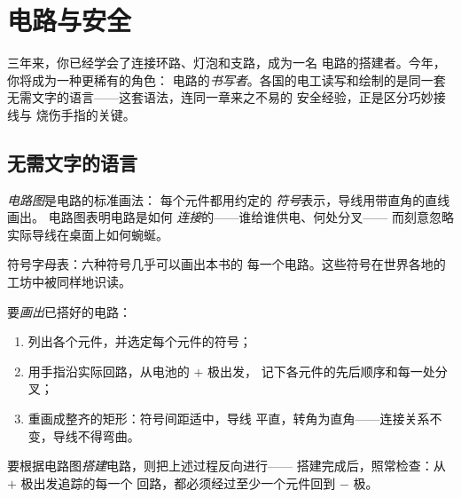 \chapter{电路与安全}\label{ch:g6:circuits-and-safety}

三年来，你已经学会了连接环路、灯泡和支路，成为一名
电路的搭建者。今年，你将成为一种更稀有的角色：
电路的\emph{书写者}。各国的电工读写和绘制的是同一套
无需文字的语言——这套语法，连同一章来之不易的
安全经验，正是区分巧妙接线与
烧伤手指的关键。

\section{无需文字的语言}

\begin{definition}[电路图]\label{def:g6:circuits-and-safety:diagram}
\emph{电路图}是电路的标准画法：
每个元件都用约定的
\emph{符号}表示，导线用带直角的直线画出。
电路图表明电路是如何
\emph{连接}的——谁给谁供电、何处分叉——
而刻意忽略实际导线在桌面上如何蜿蜒。
\end{definition}

\begin{omfigure}

{\small 符号字母表：六种符号几乎可以画出本书的
每一个电路。这些符号在世界各地的
工坊中被同样地识读。}
\end{omfigure}

\begin{method}\label{met:g6:circuits-and-safety:translate}
要\emph{画出}已搭好的电路：
\begin{enumerate}
  \item 列出各个元件，并选定每个元件的符号；
  \item 用手指沿实际回路，从电池的 $+$ 极出发，
        记下各元件的先后顺序和每一处分叉；
  \item 重画成整齐的矩形：符号间距适中，导线
        平直，转角为直角——连接关系不变，导线不得弯曲。
\end{enumerate}
要根据电路图\emph{搭建}电路，则把上述过程反向进行——
搭建完成后，照常检查：从 $+$ 极出发追踪的每一个
回路，都必须经过至少一个元件回到 $-$ 极。
\end{method}

